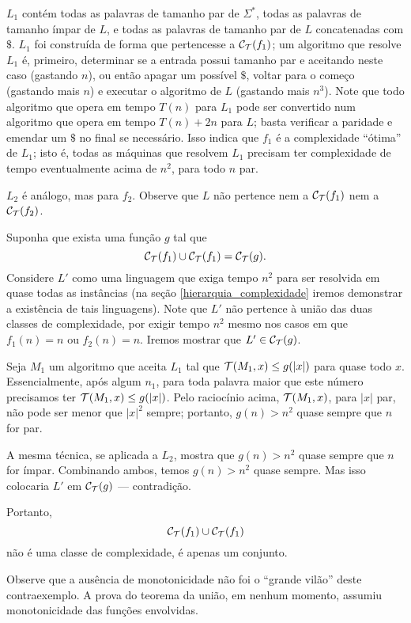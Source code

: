 \begin{counterexample}
    $L_1$ contém todas as palavras de tamanho par de $\Sigma^*$,
    todas as palavras de tamanho ímpar de $L$,
    e todas as palavras de tamanho par de $L$ concatenadas com $\$$.
    $L_1$ foi construída de forma que pertencesse
    a $\mathcal C_{\mathcal{T}}(f_1)$;
    um algoritmo que resolve $L_1$
    é, primeiro, determinar se a entrada possui tamanho par
    e aceitando neste caso
    (gastando $n$),
    ou então apagar um possível $\$$,
    voltar para o começo
    (gastando mais $n$)
    e executar o algoritmo de $L$
    (gastando mais $n^3$).
    Note que todo algoritmo que opera em tempo $T(n)$
    para $L_1$
    pode ser convertido num algoritmo que opera em tempo
    $T(n) + 2n$ para $L$;
    basta verificar a paridade e emendar um $\$$ no final
    se necessário.
    Isso indica que $f_1$ é a complexidade ``ótima''
    de $L_1$;
    isto é,
    todas as máquinas que resolvem $L_1$
    precisam ter complexidade de tempo
    eventualmente acima de $n^2$,
    para todo $n$ par.

    $L_2$ é análogo, mas para $f_2$.
    Observe que $L$ não pertence nem a $\mathcal C_{\mathcal{T}}(f_1)$
    nem a $\mathcal C_{\mathcal{T}}(f_2)$.

    Suponha que exista uma função $g$ tal que
    \begin{equation*}
        \mathcal C_{\mathcal{T}}(f_1) \cup \mathcal C_{\mathcal{T}}(f_1) =
        \mathcal C_{\mathcal{T}}(g).
    \end{equation*}
    Considere $L'$ como uma linguagem que exiga tempo $n^2$
    para ser resolvida em quase todas as instâncias
    (na seção \ref{hierarquia_complexidade}
    iremos demonstrar a existência de tais linguagens).
    Note que $L'$ não pertence à união das duas classes de complexidade,
    por exigir tempo $n^2$ mesmo nos casos em que
    $f_1(n) = n$ ou $f_2(n) = n$.
    Iremos mostrar que $L' \in \mathcal C_{\mathcal{T}}(g)$.

    Seja $M_1$ um algoritmo que aceita $L_1$
    tal que ${\mathcal{T}}(M_1, x) \leq g(|x|)$
    para quase todo $x$.
    Essencialmente,
    após algum $n_1$,
    para toda palavra maior que este número
    precisamos ter ${\mathcal{T}}(M_1, x) \leq g(|x|)$.
    Pelo raciocínio acima,
    ${\mathcal{T}}(M_1, x)$,
    para $|x|$ par,
    não pode ser menor que $|x|^2$ sempre;
    portanto, $g(n) > n^2$ quase sempre
    que $n$ for par.

    A mesma técnica,
    se aplicada a $L_2$,
    mostra que
    $g(n) > n^2$ quase sempre que $n$ for ímpar.
    Combinando ambos,
    temos $g(n) > n^2$ quase sempre.
    Mas isso colocaria $L'$ em $\mathcal C_{\mathcal{T}}(g)$
    --- contradição.

    Portanto,
    \begin{equation*}
        \mathcal C_{\mathcal{T}}(f_1) \cup \mathcal C_{\mathcal{T}}(f_1)
    \end{equation*}
    não é uma classe de complexidade,
    é apenas um conjunto.
\end{counterexample}

Observe que a ausência de monotonicidade
não foi o ``grande vilão''
deste contraexemplo.
A prova do teorema da união,
em nenhum momento,
assumiu monotonicidade das funções envolvidas.
